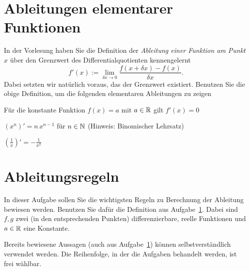 \documentclass{scrartcl}
\begin{document}
\maketitle


\section{Ableitungen elementarer Funktionen}
\label{sec:ableitungen_elementarer_funktionen}


In der Vorlesung haben Sie die Definition der \emph{Ableitung einer Funktion am Punkt $x$} über den Grenzwert des Differentialquotienten kennengelernt
\[
  f'(x) := \lim_{\delta x \to 0}  \frac{f(x + \delta x) - f(x)}{\delta x}.
\] 
Dabei setzten wir natürlich voraus, das der Grenzwert existiert.
Benutzen Sie die obige Definition, um die folgenden elementaren Ableitungen zu zeigen

\begin{subex}
  \item Für die konstante Funktion $f(x) = a$ mit $a \in \mathbb{R}$ gilt $f'(x) = 0$
  \item $\left( x^n \right)' = n \, x^{n-1}$ für $n \in \mathbb{N}$ (Hinweis: Binomischer Lehrsatz)
  \item $\left( \frac{1}{x} \right)' = -\frac{1}{x^2}$
\end{subex}



\section{Ableitungsregeln}
\label{sec:ableitungsregeln}

In dieser Aufgabe sollen Sie die wichtigsten Regeln zu Berechnung der Ableitung bewiesen werden.
Benutzen Sie dafür die Definition aus Aufgabe~\ref{sec:ableitungen_elementarer_funktionen}.
Dabei sind $f, g$ zwei (in den entsprechenden Punkten) differenzierbare, reelle Funktionen und $a \in \mathbb{R}$ eine Konstante.

Bereits bewiesene Aussagen (auch aus Aufgabe~\ref{sec:ableitungen_elementarer_funktionen}) können selbstverständlich verwendet werden.
Die Reihenfolge, in der die Aufgaben behandelt werden, ist frei wählbar.
\end{document}
